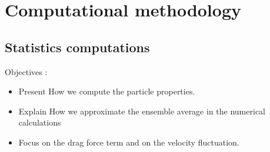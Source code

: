 \documentclass[12pt]{My_preprint}
\begin{document}
% 

% 
% 

\section{Computational methodology}
%
%


%

\subsection{Statistics computations}

Objectives : 
\begin{itemize}
    \item Present How we compute the particle properties. 
    \item Explain How we approximate the ensemble average in the numerical calculations
    \item Focus on the drag force term and on the velocity fluctuation. 
\end{itemize}
\end{document}

